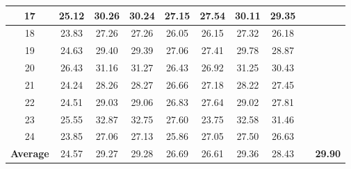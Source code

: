 \documentclass[10pt,onecolumn,letterpaper]{article}
\begin{document}
\begin{table}
\begin{center}
\begin{tabular}{|c||c|c|c|c|c|c|c|c|c|}
\\
\hline
17 & 25.12 & 30.26 & 30.24 & 27.15 & 27.54 & 30.11 & 29.35 &  & \textbf{}
\\
\hline
18 & 23.83 & 27.26 & 27.26 & 26.05 & 26.15 & 27.32 & 26.18 &  & \textbf{}
\\
\hline
19 & 24.63 & 29.40 & 29.39 & 27.06 & 27.41 & 29.78 & 28.87 &  & \textbf{}
\\
\hline
20 & 26.43 & 31.16 & 31.27 & 26.43 & 26.92 & 31.25 & 30.43 &  & \textbf{}
\\
\hline
21 & 24.24 & 28.26 & 28.27 & 26.66 & 27.18 & 28.22 & 27.45 &  & \textbf{}
\\
\hline
22 & 24.51 & 29.03 & 29.06 & 26.83 & 27.64 & 29.02 & 27.81 &  & \textbf{}
\\
\hline
23 & 25.55 & 32.87 & 32.75 & 27.60 & 23.75 & 32.58 & 31.46 &  & \textbf{}
\\
\hline
24 & 23.85 & 27.06 & 27.13 & 25.86 & 27.05 & 27.50 & 26.63 &  & \textbf{}
\\
\hline
\textbf{Average} & 24.57 & 29.27 & 29.28 & 26.69 & 26.61 & 29.36 & 28.43 &  & \textbf{29.90}
\\
\hline
\end{tabular}
\end{center}
\vspace{-1mm}
\end{table}
\end{document}

